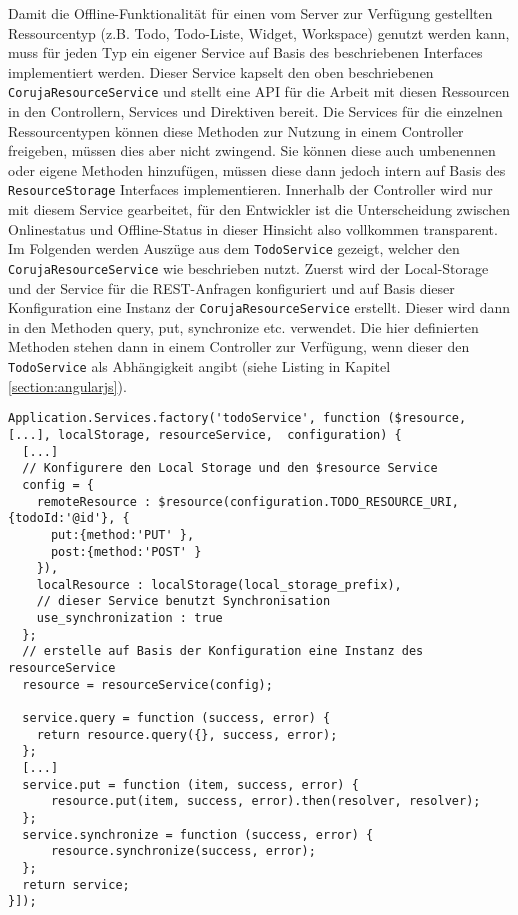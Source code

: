 Damit die Offline-Funktionalität für einen vom Server zur Verfügung gestellten Ressourcentyp (z.B. Todo, Todo-Liste, Widget, Workspace) genutzt werden kann, muss für jeden Typ ein eigener Service auf Basis des beschriebenen Interfaces implementiert werden. Dieser Service kapselt den oben beschriebenen \texttt{CorujaResourceService} und stellt eine \ac{API} für die Arbeit mit diesen Ressourcen in den Controllern, Services und Direktiven bereit. Die Services für die einzelnen Ressourcentypen können diese Methoden zur Nutzung in einem Controller freigeben, müssen dies aber nicht zwingend. Sie können diese auch umbenennen oder eigene Methoden hinzufügen, müssen diese dann jedoch intern auf Basis des \texttt{ResourceStorage} Interfaces implementieren. Innerhalb der Controller wird nur mit diesem Service gearbeitet, für den Entwickler ist die Unterscheidung zwischen Onlinestatus und Offline-Status in dieser Hinsicht also vollkommen transparent. Im Folgenden werden Auszüge aus dem \texttt{TodoService} gezeigt, welcher den \texttt{CorujaResourceService} wie beschrieben nutzt. Zuerst wird der Local-Storage und der Service für die REST-Anfragen konfiguriert und auf Basis dieser Konfiguration eine Instanz der \texttt{CorujaResourceService} erstellt. Dieser wird dann in den Methoden query, put, synchronize etc. verwendet. Die hier definierten Methoden stehen dann in einem Controller zur Verfügung, wenn dieser den \texttt{TodoService} als Abhängigkeit angibt (siehe Listing in Kapitel \ref{section:angularjs}).
\begin{lstlisting}
Application.Services.factory('todoService', function ($resource, [...], localStorage, resourceService,  configuration) {
  [...]
  // Konfigurere den Local Storage und den $resource Service
  config = {
    remoteResource : $resource(configuration.TODO_RESOURCE_URI, {todoId:'@id'}, {
      put:{method:'PUT' },
      post:{method:'POST' }
    }),
    localResource : localStorage(local_storage_prefix),
    // dieser Service benutzt Synchronisation
    use_synchronization : true
  };   
  // erstelle auf Basis der Konfiguration eine Instanz des resourceService
  resource = resourceService(config);
    
  service.query = function (success, error) {
    return resource.query({}, success, error);
  }; 
  [...]
  service.put = function (item, success, error) {
      resource.put(item, success, error).then(resolver, resolver);
  };  
  service.synchronize = function (success, error) {
      resource.synchronize(success, error);
  };
  return service;
}]);
\end{lstlisting}

